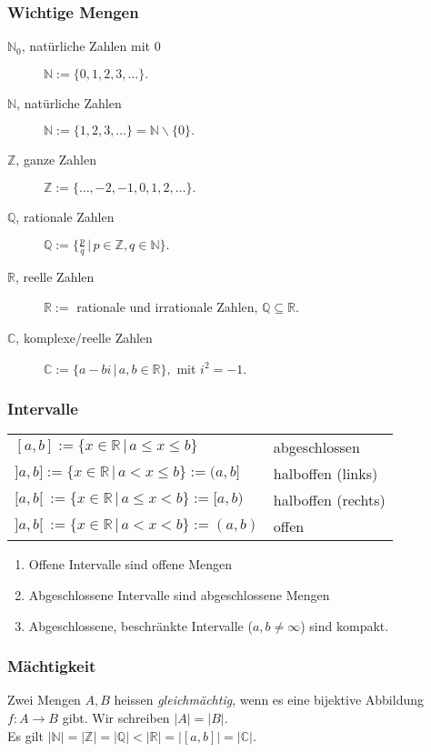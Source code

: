 \documentclass[a4paper, 9pt, DIV=24]{scrartcl}
\newcommand{\N}{\mathbb{N}}
\begin{document}
\subsubsection{Wichtige Mengen}
\begin{description}
 \item[$\N_0$, natürliche Zahlen mit 0] $\N := \{0,1,2,3,\dots\}.$
 \item[$\N$, natürliche Zahlen] $\N := \{1,2,3,\dots\} = \N\backslash\{0\}.$
 \item[$\mathbb{Z}$, ganze Zahlen] $\mathbb{Z} := \{\dots,-2,-1,0,1,2,\dots\}.$
 \item[$\mathbb{Q}$, rationale Zahlen] $\mathbb{Q} := \{\frac{p}{q}\, |\, p \in \mathbb{Z}, q \in \N \} .$
 \item[$\mathbb{R}$, reelle Zahlen] $\mathbb{R} := $ rationale und irrationale Zahlen, $\mathbb{Q} \subseteq \mathbb{R}$.
 \item[$\mathbb{C}$, komplexe/reelle Zahlen] $\mathbb{C} := \{a - bi\, |\, a, b \in \mathbb{R}\}, $ mit $i^2 = -1$.
\end{description}
\subsubsection{Intervalle}
\begin{tabular}{ll}
$[a,b] := \{x\in\mathbb{R}\, |\, a \leq x \leq b\}$ & abgeschlossen \\
$]a,b] := \{x\in\mathbb{R}\, |\, a < x \leq b\} := (a,b]$ & halboffen (links) \\
$[a,b[\ := \{x\in\mathbb{R}\, |\, a \leq x < b\} := [a,b)$ & halboffen (rechts) \\
$]a,b[\ := \{x\in\mathbb{R}\, |\, a < x < b\} := (a,b)$ & offen \\
\end{tabular}
\begin{enumerate}[label={(}\arabic*{)}]
 \item Offene Intervalle sind offene Mengen
 \item Abgeschlossene Intervalle sind abgeschlossene Mengen
 \item Abgeschlossene, beschränkte Intervalle ($a,b \neq \infty$) sind kompakt.
\end{enumerate}
\subsubsection{Mächtigkeit}
Zwei Mengen $A, B$ heissen \emph{gleichmächtig}, wenn es eine bijektive Abbildung $f: A \rightarrow B$ gibt.
Wir schreiben $|A| = |B|$. \\
Es gilt $|\N| = |\mathbb{Z}| = |\mathbb{Q}| < |\mathbb{R}| = |[a,b]| = |\mathbb{C}|$.
\end{document}
